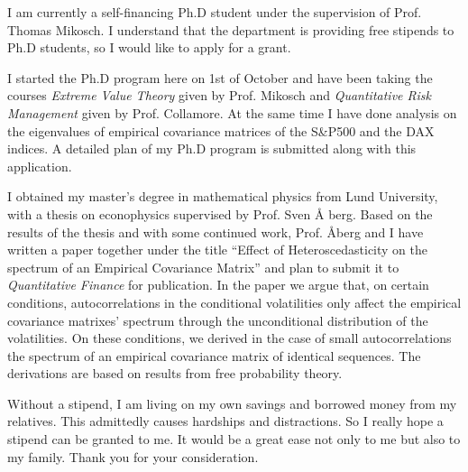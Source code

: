 \documentclass[10pt,stdletter,dateno,sigleft]{newlfm} %
\begin{document}
\begin{newlfm}
I am currently a self-financing Ph.D student under the supervision of
Prof. Thomas Mikosch. I understand that the department is providing
free stipends to Ph.D students, so I would like to apply for a grant.

I started the Ph.D program here on 1st of October and have been taking
the courses {\it Extreme Value Theory} given by Prof. Mikosch and {\it
  Quantitative Risk Management} given by Prof. Collamore. At the same
time I have done analysis on the eigenvalues of empirical covariance
matrices of the S\&P500 and the DAX indices. A detailed plan of my
Ph.D program is submitted along with this application.

I obtained my master's degree in mathematical physics from Lund
University, with a thesis on econophysics supervised by Prof. Sven \AA
berg. Based on the results of the thesis and with some continued work,
Prof. \AA berg and I have written a paper together under the title
``Effect of Heteroscedasticity on the spectrum of an Empirical
Covariance Matrix'' and plan to submit it to {\it Quantitative
  Finance} for publication. In the paper we argue that, on certain
conditions, autocorrelations in the conditional volatilities only
affect the empirical covariance matrixes' spectrum through the
unconditional distribution of the volatilities. On these
conditions, we derived in the case of small autocorrelations the
spectrum of an empirical covariance matrix of identical sequences. The
derivations are based on results from free probability theory.

Without a stipend, I am living on my own savings and borrowed money
from my relatives. This admittedly causes hardships and
distractions. So I really hope a stipend can be granted to me. It
would be a great ease not only to me but also to my family. Thank you
for your consideration.

\end{newlfm}
\end{document}
